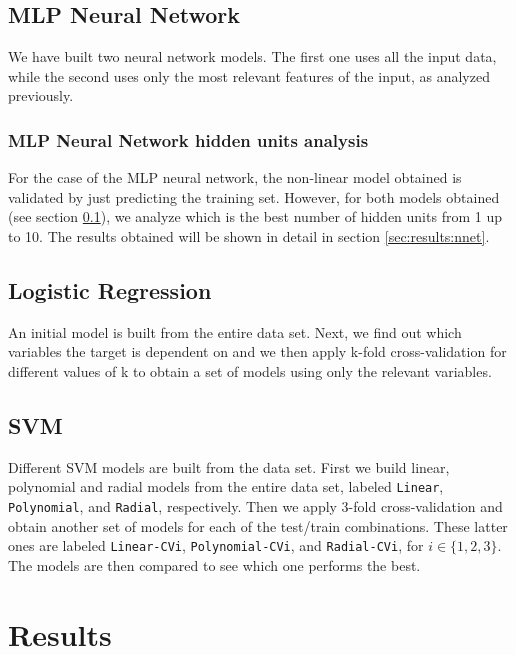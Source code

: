 \documentclass[english]{scrartcl}
\newcommand\ms[1]{\texttt{#1}}
\begin{document}
    \subsection{MLP Neural Network}
    \label{sec:methods:nnet}
    We have built two neural network models. The first one uses all the input data, while the second uses only the most
    relevant features of the input, as analyzed previously.
    
    \subsubsection{MLP Neural Network hidden units analysis}
    For the case of the MLP neural network, the non-linear model obtained is validated by just predicting the training set. However, for both models obtained
    (see section \ref{sec:methods:nnet}), we analyze which is the best number of hidden units from 1 up to 10. The results obtained will be shown in detail in
    section \ref{sec:results:nnet}.
    
    \subsection{Logistic Regression}
    An initial model is built from the entire data set. Next, we find out which variables the target is dependent on and we then apply k-fold cross-validation for different values of k to obtain a set of models using only the relevant variables.
    
    \subsection{SVM}
    Different SVM models are built from the data set. First we build linear, polynomial and radial models from the entire data set, labeled \ms{Linear}, \ms{Polynomial}, and \ms{Radial}, respectively. Then we apply 3-fold cross-validation and obtain another set of models for each of the test/train combinations. These latter ones are labeled \ms{Linear-CVi}, \ms{Polynomial-CVi}, and \ms{Radial-CVi}, for $i \in \{1,2,3\}$. The models are then compared to see which one performs the best.

\section{Results}
\end{document}
